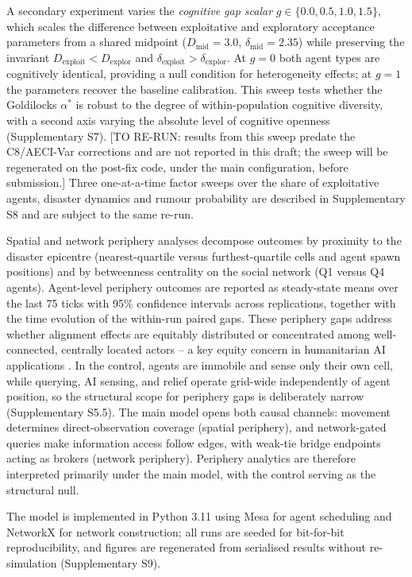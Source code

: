 \documentclass[pdflatex,sn-basic]{sn-jnl}
\begin{document}
A secondary experiment varies the \emph{cognitive gap scalar} $g \in \{0.0, 0.5, 1.0, 1.5\}$, which scales the difference between exploitative and exploratory acceptance parameters from a shared midpoint ($D_{\text{mid}} = 3.0$, $\delta_{\text{mid}} = 2.35$) while preserving the invariant $D_{\text{exploit}} < D_{\text{explor}}$ and $\delta_{\text{exploit}} > \delta_{\text{explor}}$. At $g = 0$ both agent types are cognitively identical, providing a null condition for heterogeneity effects; at $g = 1$ the parameters recover the baseline calibration. This sweep tests whether the Goldilocks $\alpha^{*}$ is robust to the degree of within-population cognitive diversity, with a second axis varying the absolute level of cognitive openness (Supplementary S7). [TO RE-RUN: results from this sweep predate the C8/AECI-Var corrections and are not reported in this draft; the sweep will be regenerated on the post-fix code, under the main configuration, before submission.] Three one-at-a-time factor sweeps over the share of exploitative agents, disaster dynamics and rumour probability are described in Supplementary S8 and are subject to the same re-run.

Spatial and network periphery analyses decompose outcomes by proximity to the disaster epicentre (nearest-quartile versus furthest-quartile cells and agent spawn positions) and by betweenness centrality on the social network (Q1 versus Q4 agents). Agent-level periphery outcomes are reported as steady-state means over the last 75 ticks with 95\% confidence intervals across replications, together with the time evolution of the within-run paired gaps. These periphery gaps address whether alignment effects are equitably distributed or concentrated among well-connected, centrally located actors -- a key equity concern in humanitarian AI applications \citep{coleman2024weaving}. In the control, agents are immobile and sense only their own cell, while querying, AI sensing, and relief operate grid-wide independently of agent position, so the structural scope for periphery gaps is deliberately narrow (Supplementary S5.5). The main model opens both causal channels: movement determines direct-observation coverage (spatial periphery), and network-gated queries make information access follow edges, with weak-tie bridge endpoints acting as brokers (network periphery). Periphery analytics are therefore interpreted primarily under the main model, with the control serving as the structural null.

The model is implemented in Python 3.11 using Mesa for agent scheduling and NetworkX for network construction; all runs are seeded for bit-for-bit reproducibility, and figures are regenerated from serialised results without re-simulation (Supplementary S9).
\end{document}
